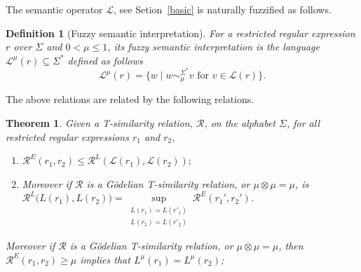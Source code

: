 \documentclass{article}
\newcommand{\cR}{{\mathcal R}}
\def\cut{\mu}
\newtheorem{definition}{Definition}[section]
\newtheorem{theorem}{Theorem}[section]
\begin{document}
\noindent The semantic operator $\mathcal L$, see Setion~\ref{basic}   is naturally fuzzified as follows.
\begin{definition}[Fuzzy semantic interpretation] For a restricted regular expression $r$ over $\Sigma$ and
$0 < \cut \le 1$, its {\em fuzzy semantic interpretation} is the language $\mathcal L^\mu(r)\subseteq \Sigma^{\ast}$ defined as follows 
\[\mathcal L^\mu (r)=\{w\mid w\sim_\mu^{\Sigma^*}v\mbox{ for } v\in \mathcal L(r)\}.\]
\end{definition}

\noindent The above relations are related by the following relations.
\begin{theorem}\label{thm:Rr-RL-bridge} Given a T-similarity relation, $\cR$, on the alphabet $\Sigma$, for all restricted regular expressions $r_1$ and $r_2$,
\begin{enumerate} 
\item$\mathcal R^E(r_1,r_2)\leq \mathcal R^L(\mathcal L(r_1),\mathcal L(r_2));$

\item Moreover if $\cR$ is a G\"odelian T-similarity relation, or $\mu\otimes\mu=\mu $, is $\mathcal{R}^L\bigl(L(r_1),L(r_2)\bigr)=\sup\limits_{\substack{L(r_1)=L(r'_1)\\L(r_2)=L(r'_2)}}\mathcal{R}^E(r_1',r_2')$.


\end{enumerate}
Moreover if $\cR$ is a G\"odelian T-similarity relation, or $\mu\otimes\mu=\mu $, then $\mathcal R^E(r_1,r_2)\geq \mu$ implies that $L^\mu(r_1)=L^\mu(r_2)$;
\end{theorem}
\end{document}

